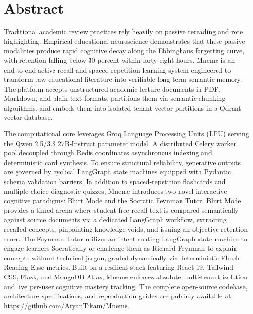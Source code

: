 \documentclass[12pt,a4paper,oneside]{report}
\begin{document}
\chapter*{Abstract}

Traditional academic review practices rely heavily on passive rereading and rote highlighting. Empirical educational neuroscience demonstrates that these passive modalities produce rapid cognitive decay along the Ebbinghaus forgetting curve, with retention falling below 30 percent within forty-eight hours. Mneme is an end-to-end active recall and spaced repetition learning system engineered to transform raw educational literature into verifiable long-term semantic memory. The platform accepts unstructured academic lecture documents in PDF, Markdown, and plain text formats, partitions them via semantic chunking algorithms, and embeds them into isolated tenant vector partitions in a Qdrant vector database.

The computational core leverages Groq Language Processing Units (LPU) serving the Qwen 2.5/3.8 27B-Instruct parameter model. A distributed Celery worker pool decoupled through Redis coordinates asynchronous indexing and deterministic card synthesis. To ensure structural reliability, generative outputs are governed by cyclical LangGraph state machines equipped with Pydantic schema validation barriers. In addition to spaced-repetition flashcards and multiple-choice diagnostic quizzes, Mneme introduces two novel interactive cognitive paradigms: Blurt Mode and the Socratic Feynman Tutor. Blurt Mode provides a timed arena where student free-recall text is compared semantically against source documents via a dedicated LangGraph workflow, extracting recalled concepts, pinpointing knowledge voids, and issuing an objective retention score. The Feynman Tutor utilizes an intent-routing LangGraph state machine to engage learners Socratically or challenge them as Richard Feynman to explain concepts without technical jargon, graded dynamically via deterministic Flesch Reading Ease metrics. Built on a resilient stack featuring React 19, Tailwind CSS, Flask, and MongoDB Atlas, Mneme enforces absolute multi-tenant isolation and live per-user cognitive mastery tracking. The complete open-source codebase, architecture specifications, and reproduction guides are publicly available at \url{https://github.com/AryanTikam/Mneme}.
\end{document}
